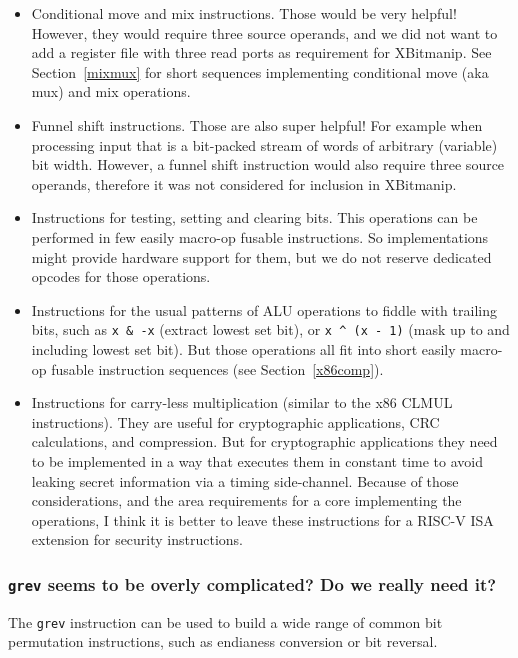 \begin{itemize}
\item Conditional move and mix instructions. Those would be very helpful! However,
they would require three source operands, and we did not want to add a register
file with three read ports as requirement for XBitmanip. See Section~\ref{mixmux}
for short sequences implementing conditional move (aka mux) and mix operations.

\item Funnel shift instructions. Those are also super helpful! For example when
processing input that is a bit-packed stream of words of arbitrary (variable)
bit width. However, a funnel shift instruction would also require three source
operands, therefore it was not considered for inclusion in XBitmanip.

\item Instructions for testing, setting and clearing bits. This operations can
be performed in few easily macro-op fusable instructions. So implementations
might provide hardware support for them, but we do not reserve dedicated opcodes
for those operations.

\item Instructions for the usual patterns of ALU operations to fiddle with
trailing bits, such as {\tt x \& -x} (extract lowest set bit), or
{\tt x \^{} (x - 1)} (mask up to and including lowest set bit). But those
operations all fit into short easily macro-op fusable instruction sequences
(see Section~\ref{x86comp}).

\item Instructions for carry-less multiplication (similar to the x86 CLMUL
instructions). They are useful for cryptographic applications, CRC
calculations, and compression. But for cryptographic applications they need to
be implemented in a way that executes them in constant time to avoid leaking
secret information via a timing side-channel. Because of those considerations,
and the area requirements for a core implementing the operations, I think
it is better to leave these instructions for a RISC-V ISA extension for security
instructions.
\end{itemize}

\subsubsection{\texttt{grev} seems to be overly complicated? Do we really need it?}

The \texttt{grev} instruction can be used to build a wide range of common
bit permutation instructions, such as endianess conversion or bit reversal.

